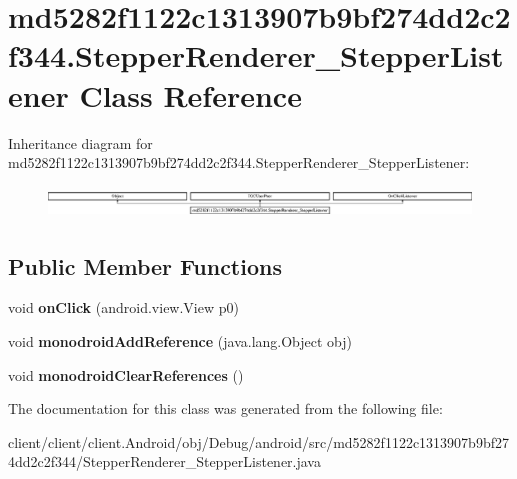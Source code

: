 \hypertarget{classmd5282f1122c1313907b9bf274dd2c2f344_1_1StepperRenderer__StepperListener}{}\section{md5282f1122c1313907b9bf274dd2c2f344.\+Stepper\+Renderer\+\_\+\+Stepper\+Listener Class Reference}
\label{classmd5282f1122c1313907b9bf274dd2c2f344_1_1StepperRenderer__StepperListener}
Inheritance diagram for md5282f1122c1313907b9bf274dd2c2f344.\+Stepper\+Renderer\+\_\+\+Stepper\+Listener\+:\begin{figure}[H]
\begin{center}
\leavevmode
\includegraphics[height=0.820513cm]{classmd5282f1122c1313907b9bf274dd2c2f344_1_1StepperRenderer__StepperListener}
\end{center}
\end{figure}
\subsection*{Public Member Functions}
\begin{DoxyCompactItemize}
\item 
\hypertarget{classmd5282f1122c1313907b9bf274dd2c2f344_1_1StepperRenderer__StepperListener_a1dc3c323aa23c6111cc678bfdcd7f422}{}void {\bfseries on\+Click} (android.\+view.\+View p0)\label{classmd5282f1122c1313907b9bf274dd2c2f344_1_1StepperRenderer__StepperListener_a1dc3c323aa23c6111cc678bfdcd7f422}

\item 
\hypertarget{classmd5282f1122c1313907b9bf274dd2c2f344_1_1StepperRenderer__StepperListener_a82fa0f47c552eff8085b5f0adb273754}{}void {\bfseries monodroid\+Add\+Reference} (java.\+lang.\+Object obj)\label{classmd5282f1122c1313907b9bf274dd2c2f344_1_1StepperRenderer__StepperListener_a82fa0f47c552eff8085b5f0adb273754}

\item 
\hypertarget{classmd5282f1122c1313907b9bf274dd2c2f344_1_1StepperRenderer__StepperListener_aaa166ef2cbae49a77ef31b660e81c343}{}void {\bfseries monodroid\+Clear\+References} ()\label{classmd5282f1122c1313907b9bf274dd2c2f344_1_1StepperRenderer__StepperListener_aaa166ef2cbae49a77ef31b660e81c343}

\end{DoxyCompactItemize}


The documentation for this class was generated from the following file\+:\begin{DoxyCompactItemize}
\item 
client/client/client.\+Android/obj/\+Debug/android/src/md5282f1122c1313907b9bf274dd2c2f344/Stepper\+Renderer\+\_\+\+Stepper\+Listener.\+java\end{DoxyCompactItemize}
